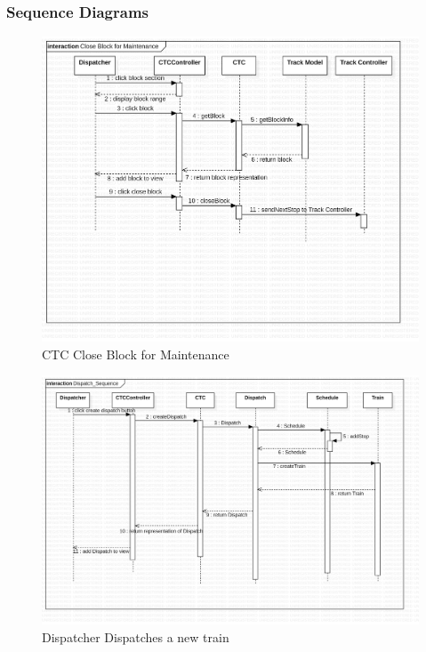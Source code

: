 \documentclass{article}
\begin{document}
    \subsubsection{Sequence Diagrams}
    \begin{figure}[H]
        \centering
        \includegraphics[width=\textwidth]{./CTC/Close_Block_for_Maintenance.png}
        \caption{CTC Close Block for Maintenance}
        \label{fig:Use Case: CTC Closes Block for Maintenance}
    \end{figure}
     \begin{figure}[H]
        \centering
        \includegraphics[width=\textwidth]{./CTC/Dispatch_Sequence.png}
        \caption{Dispatcher Dispatches a new train}
        \label{fig:Use Case: Dispatcher dispatches a new train}
    \end{figure}
\end{document}

